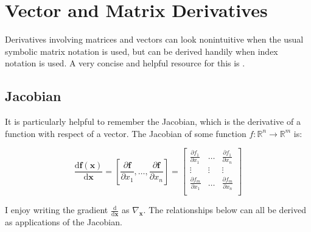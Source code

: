 \section{Vector and Matrix Derivatives}

Derivatives involving matrices and vectors can look nonintuitive when the usual symbolic matrix notation is used, but can be derived handily when index notation is used. A very concise and helpful resource for this is . 


\subsection{Jacobian}
It is particularly helpful to remember the Jacobian, which is the derivative of a function with respect of a vector. The Jacobian of some function $f: \mathbb{R}^n \rightarrow \mathbb{R}^m$ is:

\begin{equation}
\frac{\mathrm{d}  \mathbf{f}(\mathbf{x})}{\mathrm{d} \mathbf{x}}=\left[\frac{\partial \mathbf{f}}{\partial x_1}, \hdots, \frac{\partial \mathbf{f}}{\partial x_n} \right]=\left[\begin{array}{ccc}
\frac{\partial  f_1}{\partial  x_1} & \hdots & \frac{\partial  f_1}{\partial  x_n} \\
\vdots & \vdots & \vdots \\
\frac{\partial  f_m}{\partial  x_1} & \hdots & \frac{\partial  f_m}{\partial  x_n} \\
\end{array}\right]
\end{equation}

I enjoy writing the gradient $\frac{\mathrm{d}}{\mathrm{d}\mathbf{x}}$ as $\nabla_\mathbf{x}$. The relationships below can all be derived as applications of the Jacobian.

